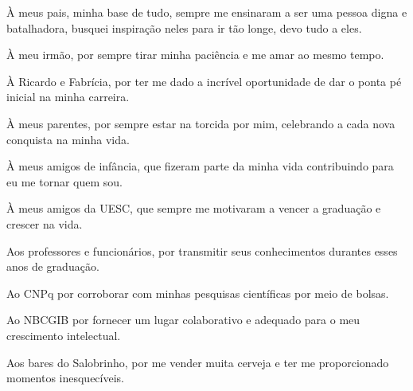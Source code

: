 \begin{agradecimentos}
À meus pais, minha base de tudo, sempre me ensinaram a ser uma pessoa digna e batalhadora, busquei inspiração neles para ir tão longe, devo tudo a eles.

À meu irmão, por sempre tirar minha paciência e me amar ao mesmo tempo.

À Ricardo e Fabrícia, por ter me dado a incrível oportunidade de dar o ponta pé inicial na minha carreira.

À meus parentes, por sempre estar na torcida por mim, celebrando a cada nova conquista na minha vida.

À meus amigos de infância, que fizeram parte da minha vida contribuindo para eu me tornar quem sou.

À meus amigos da UESC, que sempre me motivaram a vencer a graduação e crescer na vida.

Aos professores e funcionários, por transmitir seus conhecimentos durantes esses anos de graduação.

Ao CNPq por corroborar com minhas pesquisas científicas por meio de bolsas.

Ao NBCGIB por fornecer um lugar colaborativo e adequado para o meu crescimento intelectual.

Aos bares do Salobrinho, por me vender muita cerveja e ter me proporcionado momentos inesquecíveis.

\end{agradecimentos}
